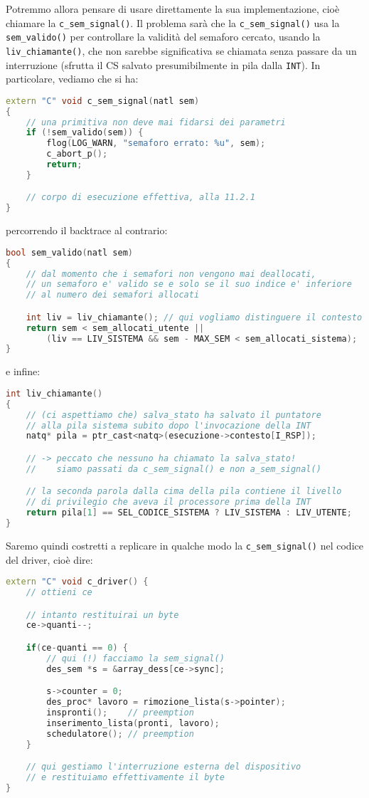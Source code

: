 \documentclass[a4paper,11pt]{article}
\begin{document}
Potremmo allora pensare di usare direttamente la sua implementazione, cioè chiamare la \lstinline|c_sem_signal()|.
Il problema sarà che la \lstinline|c_sem_signal()| usa la \lstinline|sem_valido()| per controllare la validità del semaforo cercato, usando la \lstinline|liv_chiamante()|, che non sarebbe significativa se chiamata senza passare da un interruzione (sfrutta il CS salvato presumibilmente in pila dalla \lstinline|INT|).
In particolare, vediamo che si ha:
\begin{lstlisting}[language=C++, style=codestyle]	
extern "C" void c_sem_signal(natl sem)
{
	// una primitiva non deve mai fidarsi dei parametri
	if (!sem_valido(sem)) {
		flog(LOG_WARN, "semaforo errato: %u", sem);
		c_abort_p();
		return;
	}

	// corpo di esecuzione effettiva, alla 11.2.1 
}
\end{lstlisting}
percorrendo il backtrace al contrario:
\begin{lstlisting}[language=C++, style=codestyle]	
bool sem_valido(natl sem)
{
	// dal momento che i semafori non vengono mai deallocati,
	// un semaforo e' valido se e solo se il suo indice e' inferiore
	// al numero dei semafori allocati

	int liv = liv_chiamante(); // qui vogliamo distinguere il contesto
	return sem < sem_allocati_utente ||
		(liv == LIV_SISTEMA && sem - MAX_SEM < sem_allocati_sistema);
}
\end{lstlisting}
e infine:
\begin{lstlisting}[language=C++, style=codestyle]	
int liv_chiamante()
{
	// (ci aspettiamo che) salva_stato ha salvato il puntatore 
	// alla pila sistema subito dopo l'invocazione della INT
	natq* pila = ptr_cast<natq>(esecuzione->contesto[I_RSP]);

	// -> peccato che nessuno ha chiamato la salva_stato!
	//    siamo passati da c_sem_signal() e non a_sem_signal()

	// la seconda parola dalla cima della pila contiene il livello
	// di privilegio che aveva il processore prima della INT
	return pila[1] == SEL_CODICE_SISTEMA ? LIV_SISTEMA : LIV_UTENTE;
}
\end{lstlisting}

Saremo quindi costretti a replicare in qualche modo la \lstinline|c_sem_signal()| nel codice del driver, cioè dire:
\begin{lstlisting}[language=C++, style=codestyle]	
extern "C" void c_driver() {
	// ottieni ce

	// intanto restituirai un byte
	ce->quanti--;

	if(ce-quanti == 0) {
		// qui (!) facciamo la sem_signal()
		des_sem *s = &array_dess[ce->sync];

		s->counter = 0;
		des_proc* lavoro = rimozione_lista(s->pointer);
		inspronti();	// preemption
		inserimento_lista(pronti, lavoro);
		schedulatore();	// preemption
	}

	// qui gestiamo l'interruzione esterna del dispositivo
	// e restituiamo effettivamente il byte
}
\end{lstlisting}
\end{document}
